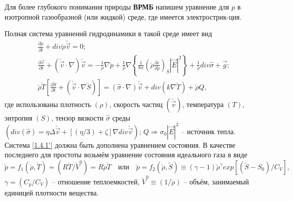 \documentclass[a4paper]{article}
\begin{document}
Для более глубокого понимания природы \textbf{ВРМБ} напишем уравнение для $p$  в изотропной газообразной (или жидкой) среде, где имеется электрострик-ция. 

Полная система уравнений гидродинамики в такой среде имеет вид
\begin{equation}
	\begin{split}
		&\frac{\partial\breve{\rho}}{\partial t}+div\breve{\rho}\breve{\vec{v}}=0;\\
		&\frac{\partial\breve{\vec{v}}}{\partial t}+\left(\breve{\vec{v}}\cdot\nabla\right)\breve{\vec{v}}=-\frac{1}{\breve{\rho}}\nabla\breve{p}+\frac{1}{\breve{\rho}}\nabla\left\{\frac{1}{8\pi}\left(\breve{\rho}\frac{\partial\varepsilon}{\partial\breve{\rho}}\right)_{S}\left|\vec{E}\right|^{2}\right\}+\frac{1}{\breve{\rho}}div\hat{\sigma}+\vec{g};\\
		&\breve{\rho}\breve{T}\left[\frac{\partial\breve{S}}{\partial t}+\left(\breve{\vec{v}}\cdot\nabla\breve{S}\right)\right]=(\hat{\sigma}\cdot\nabla)\breve{\vec{v}}+div(k\nabla\breve{T})+\breve{\rho}Q,
	\end{split}
	\tag{1'}\label{1.4.1'}
\end{equation}
где использованы плотность $(\rho)$,  скорость частиц $(\breve{\vec{v}})$, температура $(T)$, энтропия $(S)$, тензор вязкости $\hat{\sigma}$  среды $(div(\hat{\sigma})=\eta\Delta\breve{\vec{v}}+\left[(\eta/3)+\zeta\right]\nabla div\breve{\vec{v}})$; $Q\Rightarrow\sigma_{0}\left|\vec{E}\right|^{2}$ -- источник тепла. Система \eqref{1.4.1'} должна быть дополнена уравнением состояния. В качестве последнего для простоты возьмём уравнение состояния идеального газа в виде 
$$\breve{p}=f_{1}(\breve{\rho},\breve{T})=(R\breve{T}/\breve{V}^{0})=R\breve{\rho}\breve{T}\quad\text{или}\quad\breve{p}=f_{2}(\breve{\rho},\breve{S})\equiv(\gamma-1)\breve{\rho}^{\gamma}exp\left[(\breve{S}-S_{0})/C_{V}\right],$$
$\gamma=(C_{p}/C_{V})$ -- отношение теплоемкостей, $\breve{V}^{0}\equiv(1/\breve{\rho})$  -- объём, занимаемый единицей плотности вещества. 
\end{document}
